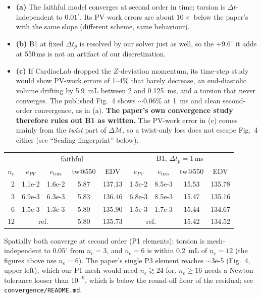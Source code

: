 \documentclass[10pt]{article}
\begin{document}
\begin{itemize}
\item \textbf{(a)} The faithful model converges at second order in time; torsion is
  $\Delta t$-independent to $0.01^\circ$. Its PV-work errors are about $10\times$ below the
  paper's with the same slope (different scheme, same behaviour).
\item \textbf{(b)} B1 at fixed $\Delta t_p$ is resolved by our solver just as well, so the
  $+9.6^\circ$ it adds at 550\,ms is not an artifact of our discretization.
\item \textbf{(c)} If CardiacLab dropped the $Z$-deviation momentum, its time-step study would
  show PV-work errors of 1--4\% that barely decrease, an end-diastolic volume drifting by
  \SI{5.9}{mL} between 2 and \SI{0.125}{ms}, and a torsion that never converges. The
  published Fig.~4 shows $\sim$0.06\% at \SI{1}{ms} and clean second-order convergence, as in (a).
  \textbf{The paper's own convergence study therefore rules out B1 as written.} The PV-work
  error in (c) comes mainly from the \emph{twist} part of $\Delta\mathcal M$, so a twist-only
  loss does not escape Fig.~4 either (see ``Scaling fingerprint'' below).
\end{itemize}
\begin{center}\begin{tabular}{r|cccc|cccc}
\toprule
 & \multicolumn{4}{c|}{faithful} & \multicolumn{4}{c}{B1, $\Delta t_p{=}1$\,ms} \\
$n_e$ & $e_{PV}$ & $e_\text{tors}$ & tw@550 & EDV & $e_{PV}$ & $e_\text{tors}$ & tw@550 & EDV \\ \midrule
2  & 1.1e-2 & 1.6e-2 & 5.87 & 137.13 & 1.5e-2 & 8.5e-3 & 15.53 & 135.78 \\
3  & 6.9e-3 & 6.3e-3 & 5.83 & 136.46 & 6.8e-3 & 8.5e-3 & 15.47 & 135.16 \\
6  & 1.5e-3 & 1.3e-3 & 5.80 & 135.90 & 1.5e-3 & 1.7e-3 & 15.44 & 134.67 \\
12 & \multicolumn{2}{c}{ref.} & 5.80 & 135.73 & \multicolumn{2}{c}{ref.} & 15.42 & 134.52 \\
\bottomrule
\end{tabular}\end{center}
Spatially both converge at second order (P1 elements); torsion is mesh-independent to $0.05^\circ$
from $n_e=3$, and $n_e=6$ is within \SI{0.2}{mL} of $n_e=12$ (the figures above use $n_e=6$).
The paper's single P3 element reaches $\sim$3e-5 (Fig.~4, upper left), which our P1 mesh would
need $n_e\gtrsim24$ for. $n_e\geq16$ needs a Newton tolerance looser than $10^{-9}$, which is
below the round-off floor of the residual; see \texttt{convergence/README.md}.
\end{document}
